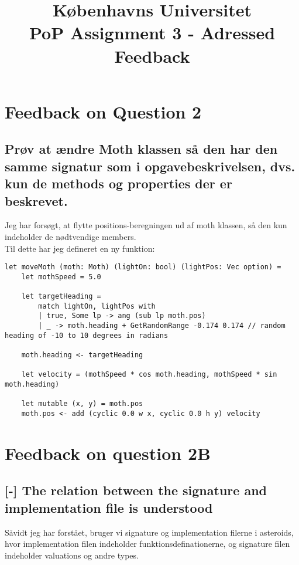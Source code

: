 \documentclass[a4paper,12pt]{article}
\begin{document}
% 

\title{Københavns Universitet\\
PoP Assignment 3 - Adressed Feedback}
\maketitle %

\section{Feedback on Question 2}

\subsection{Prøv at ændre Moth klassen så den har den samme signatur som i opgavebeskrivelsen, dvs. kun de
methods og properties der er beskrevet.}
Jeg har forsøgt, at flytte positions-beregningen ud af moth klassen, så den kun indeholder de nødtvendige members.\\
Til dette har jeg defineret en ny funktion:
\begin{lstlisting}
let moveMoth (moth: Moth) (lightOn: bool) (lightPos: Vec option) =
    let mothSpeed = 5.0

    let targetHeading =
        match lightOn, lightPos with
        | true, Some lp -> ang (sub lp moth.pos)
        | _ -> moth.heading + GetRandomRange -0.174 0.174 // random heading of -10 to 10 degrees in radians

    moth.heading <- targetHeading

    let velocity = (mothSpeed * cos moth.heading, mothSpeed * sin moth.heading)

    let mutable (x, y) = moth.pos
    moth.pos <- add (cyclic 0.0 w x, cyclic 0.0 h y) velocity
\end{lstlisting}

\section{Feedback on question 2B}

\subsection{[-] The relation between the signature and implementation file is understood}
Såvidt jeg har forstået, bruger vi signature og implementation filerne i asteroids, hvor implementation filen indeholder funktionsdefinationerne, og signature filen indeholder valuations og andre types.
\end{document}
